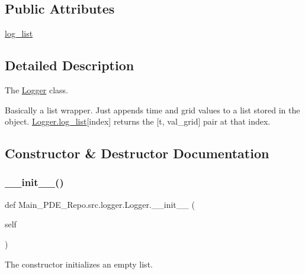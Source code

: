 \subsection*{Public Attributes}
\begin{DoxyCompactItemize}
\item 
\hyperlink{classMain__PDE__Repo_1_1src_1_1logger_1_1Logger_a159655c83565fd1bfbbabb470ea7da0f}{log\+\_\+list}
\end{DoxyCompactItemize}


\subsection{Detailed Description}
The \hyperlink{classMain__PDE__Repo_1_1src_1_1logger_1_1Logger}{Logger} class. 

Basically a list wrapper. Just appends time and grid values to a list stored in the object. \hyperlink{classMain__PDE__Repo_1_1src_1_1logger_1_1Logger_a159655c83565fd1bfbbabb470ea7da0f}{Logger.\+log\+\_\+list}\mbox{[}index\mbox{]} returns the \mbox{[}t, val\+\_\+grid\mbox{]} pair at that index. 

\subsection{Constructor \& Destructor Documentation}
\mbox{\label{classMain__PDE__Repo_1_1src_1_1logger_1_1Logger_a1cb1b576ea43629aba66f291b97099e2}} 
\subsubsection{\texorpdfstring{\+\_\+\+\_\+init\+\_\+\+\_\+()}{\_\_init\_\_()}}
{\footnotesize\ttfamily def Main\+\_\+\+P\+D\+E\+\_\+\+Repo.\+src.\+logger.\+Logger.\+\_\+\+\_\+init\+\_\+\+\_\+ (\begin{DoxyParamCaption}\item[{}]{self }\end{DoxyParamCaption})}



The constructor initializes an empty list. 



